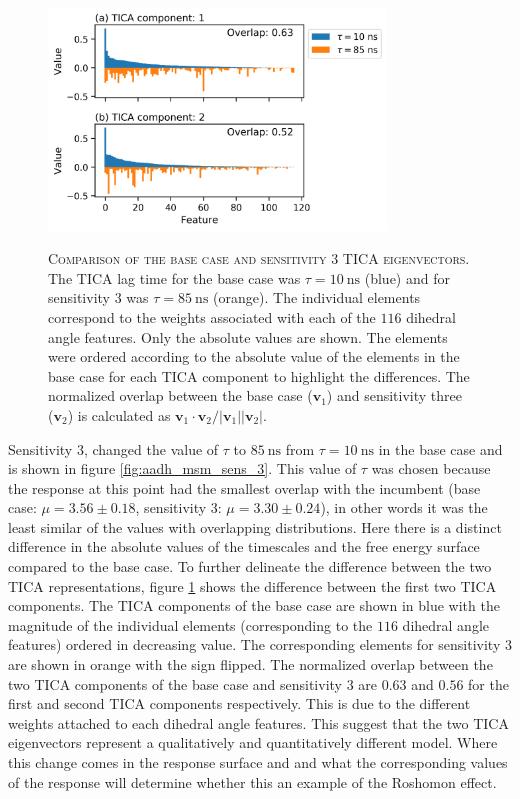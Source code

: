 \begin{figure}
    \centering
    \caption[Comparison of the base case and sensitivity 3 TICA eigenvectors]{\textsc{Comparison of the base case and sensitivity 3 TICA eigenvectors}. The TICA lag time for the base case was $\tau=\SI{10}{\nano\second}$ (blue) and for sensitivity 3 was $\tau=\SI{85}{\nano\second}$ (orange). The individual elements correspond to the weights associated with each of the $116$ dihedral angle features. Only the absolute values are shown. The elements were ordered according to the absolute value of the elements in the base case for each TICA component to highlight the differences. The normalized overlap between the base case ($\mathbf{v}_{1}$) and sensitivity three ($\mathbf{v}_{2}$) is calculated as $\mathbf{v}_{1}\cdot\mathbf{v}_{2}/|\mathbf{v}_{1}||\mathbf{v}_{2}|$.}
    \includegraphics[width=0.8\textwidth]{chapters/msm_optimization/figures/aadh_msm_sens_3_tica.png}
    \label{fig:aadh_msm_sens_3_tica}
\end{figure}

Sensitivity 3, changed the value of $\tau$ to $\SI{85}{\nano\second}$ from $\tau = \SI{10}{\nano\second}$ in the base case and is shown in figure \ref{fig:aadh_msm_sens_3}.   This value of $\tau$ was chosen because the response at this point had the smallest  overlap with the incumbent (base case: $\mu=3.56 \pm 0.18$, sensitivity 3: $\mu=3.30 \pm 0.24$), in other words it was the least similar of the values with overlapping distributions. Here there is a distinct difference in the absolute values of the timescales and the free energy surface compared to the base case. To further delineate the difference between the two TICA representations, figure \ref{fig:aadh_msm_sens_3_tica} shows the difference between the first two TICA components. The  TICA components of the base case are shown in blue with the magnitude of the individual elements (corresponding to the $116$ dihedral angle features) ordered in decreasing value. The corresponding elements for sensitivity 3 are shown in orange with the sign flipped. The normalized overlap between the two TICA components of the base case and sensitivity 3 are $0.63$ and $0.56$  for the first and second TICA components respectively. This is due to the different weights attached to each dihedral angle features. This suggest that the two TICA eigenvectors represent a qualitatively and quantitatively different model. Where this change comes in the response surface and and what the corresponding values of the response will determine whether this an example of the Roshomon effect. 



